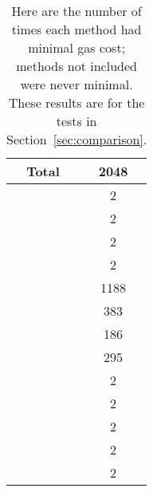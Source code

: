 \begin{table}[pt]
\centering
\begin{tabular}{|c|S[table-format=4.0]|}
\hline
Total & 2048 \\
\hline
\Uniswap{}         &    2 \\
\OpenZeppelinTwo{} &    2 \\
\UnrolledOne{}     &    2 \\
\UnrolledTwo{}     &    2 \\
 \UnrolledThree{} &  1188 \\
\WhileOne{}        &  383 \\
\WhileTwo{}        &  186 \\
\WhileThree{}      &  295 \\
\BitLength{}       &    2 \\
\Linear{}          &    2 \\
\HyperFour{}       &    2 \\
\LookupFour{}      &    2 \\
\LookupEight{}     &    2 \\
\hline
\end{tabular}
\caption[Minimal Gas Costs Statistics]{Here are the number of times
    each method had minimal gas cost;
    methods not included were never minimal.
    These results are for the tests in Section~\ref{sec:comparison}.
    }
\label{table:minimal_gas_costs}
\end{table}

